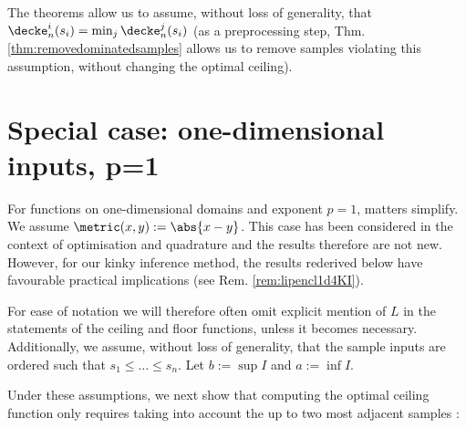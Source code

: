 \begin{rem} \label{rem:assumptionsceil}
The theorems allow us to assume, without loss of generality, that $\decke_n^i(s_i) = \min_j \decke_n^j(s_i)$ (as a preprocessing step, Thm. 
\ref{thm:removedominatedsamples} allows us to remove samples violating this assumption, without changing the optimal ceiling). 
\end{rem}



\section{Special case: one-dimensional inputs, p=1}
\label{sec:onedimlipfloorceil}
For functions on one-dimensional domains and exponent $p=1$, matters simplify. We assume $\metric(x,y) := \abs{x-y}$. This case has been considered in the context of optimisation \cite{Shubert:72} and quadrature \cite{Baran2008} and the results therefore are not new. However, for our kinky inference method, the results rederived below have favourable practical implications (see Rem. \ref{rem:lipencl1d4KI}).
%


For ease of notation we will therefore often omit explicit mention of $L$ in the statements of the ceiling and floor functions, unless it becomes necessary. Additionally, we assume, without loss of generality, that the sample inputs are ordered such that $s_1\leq \ldots \leq s_n$. Let $b := \sup I $ and $a := \inf I$.



Under these assumptions, we next show that computing the optimal ceiling function only requires taking into account the up to two most adjacent samples :

